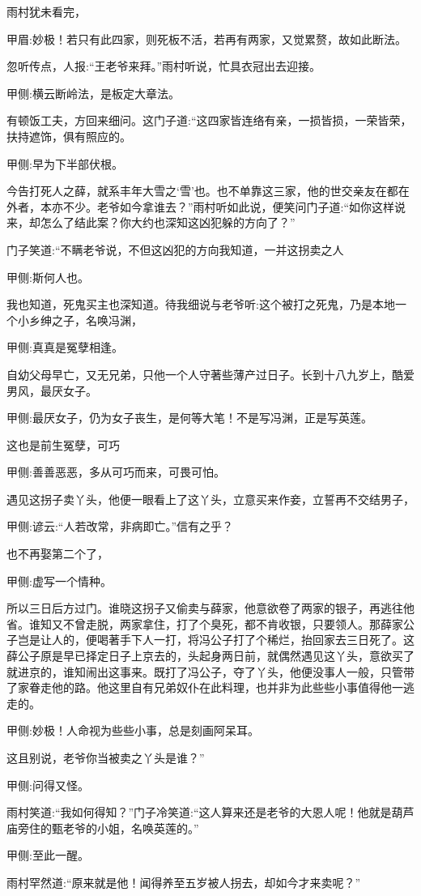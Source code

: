 \begin{parag}
    雨村犹未看完，\begin{note}甲眉:妙极！若只有此四家，则死板不活，若再有两家，又觉累赘，故如此断法。\end{note}忽听传点，人报:“王老爷来拜。”雨村听说，忙具衣冠出去迎接。\begin{note}甲侧:横云断岭法，是板定大章法。\end{note}有顿饭工夫，方回来细问。这门子道:“这四家皆连络有亲，一损皆损，一荣皆荣，扶持遮饰，俱有照应的。\begin{note}甲侧:早为下半部伏根。\end{note}今告打死人之薛，就系丰年大雪之‘雪’也。也不单靠这三家，他的世交亲友在都在外者，本亦不少。老爷如今拿谁去？”雨村听如此说，便笑问门子道:“如你这样说来，却怎么了结此案？你大约也深知这凶犯躲的方向了？”
\end{parag}


\begin{parag}
    门子笑道:“不瞒老爷说，不但这凶犯的方向我知道，一并这拐卖之人\begin{note}甲侧:斯何人也。\end{note}我也知道，死鬼买主也深知道。待我细说与老爷听:这个被打之死鬼，乃是本地一个小乡绅之子，名唤冯渊，\begin{note}甲侧:真真是冤孽相逢。\end{note}自幼父母早亡，又无兄弟，只他一个人守著些薄产过日子。长到十八九岁上，酷爱男风，最厌女子。\begin{note}甲侧:最厌女子，仍为女子丧生，是何等大笔！不是写冯渊，正是写英莲。\end{note}这也是前生冤孽，可巧\begin{note}甲侧:善善恶恶，多从可巧而来，可畏可怕。\end{note}遇见这拐子卖丫头，他便一眼看上了这丫头，立意买来作妾，立誓再不交结男子，\begin{note}甲侧:谚云:“人若改常，非病即亡。”信有之乎？\end{note}也不再娶第二个了，\begin{note}甲侧:虚写一个情种。\end{note}所以三日后方过门。谁晓这拐子又偷卖与薛家，他意欲卷了两家的银子，再逃往他省。谁知又不曾走脱，两家拿住，打了个臭死，都不肯收银，只要领人。那薛家公子岂是让人的，便喝著手下人一打，将冯公子打了个稀烂，抬回家去三日死了。这薛公子原是早已择定日子上京去的，头起身两日前，就偶然遇见这丫头，意欲买了就进京的，谁知闹出这事来。既打了冯公子，夺了丫头，他便没事人一般，只管带了家眷走他的路。他这里自有兄弟奴仆在此料理，也并非为此些些小事值得他一逃走的。\begin{note}甲侧:妙极！人命视为些些小事，总是刻画阿呆耳。\end{note}这且别说，老爷你当被卖之丫头是谁？”\begin{note}甲侧:问得又怪。\end{note}雨村笑道:“我如何得知？”门子冷笑道:“这人算来还是老爷的大恩人呢！他就是葫芦庙旁住的甄老爷的小姐，名唤英莲的。”\begin{note}甲侧:至此一醒。\end{note}雨村罕然道:“原来就是他！闻得养至五岁被人拐去，却如今才来卖呢？”
\end{parag}


